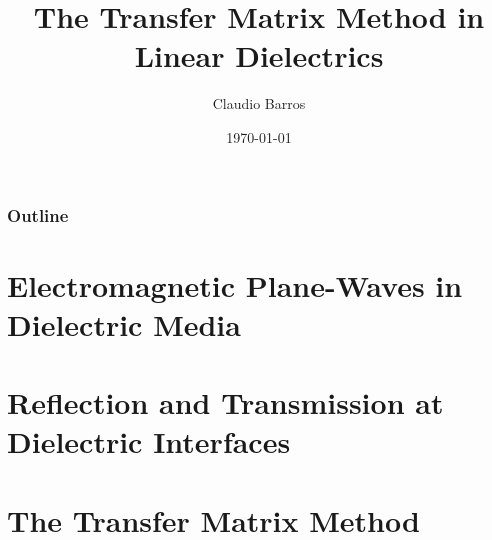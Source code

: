 \documentclass{beamer}
\title{The Transfer Matrix Method in Linear Dielectrics}
\author{Claudio Barros}
\institute{University at Buffalo}
\date{\today}
\begin{document}
	

	


	
\begin{frame}
	
\titlepage

\end{frame}







\begin{frame}
	
\frametitle{Outline}

\tableofcontents

\end{frame}






\section{Electromagnetic Plane-Waves in Dielectric Media}

\section{Reflection and Transmission at Dielectric Interfaces}

\section{The Transfer Matrix Method}
\end{document}
